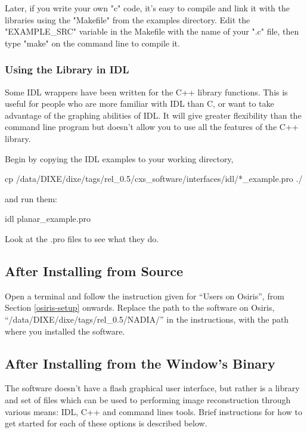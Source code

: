 \documentclass[]{nadia}
\begin{document}
Later, if you write your own "c" code, it's easy to compile and link
it with the libraries using the "Makefile" from the examples
directory. Edit the "EXAMPLE\_SRC" variable in the Makefile with the
name of your ".c" file, then type "make" on the command line to
compile it.

\subsubsection{Using the Library in IDL}

Some IDL wrappers have been written for the C++ library
functions. This is useful for people who are more familiar with IDL
than C, or want to take advantage of the graphing abilities of IDL.
It will give greater flexibility than the command line program but
doesn't allow you to use all the features of the C++ library.

Begin by copying the IDL examples to your working directory, 
\begin{myverbatim}
   cp /data/DIXE/dixe/tags/rel_0.5/cxs_software/interfaces/idl/*_example.pro ./ 
\end{myverbatim}
and run them: 
\begin{myverbatim}
   idl planar_example.pro
\end{myverbatim}

Look at the .pro files to see what they do. 


\subsection{After Installing from Source}

Open a terminal and follow the instruction given for ``Users on
Osiris'', from Section \ref{osiris-setup} onwards. Replace the path to
the software on Osiris,
``/data/DIXE/dixe/tags/rel\_0.5/NADIA/'' in the instructions,
with the path where you installed the software.

\subsection{After Installing from the Window's Binary}

The software doesn't have a flash graphical user interface, but rather
is a library and set of files which can be used to performing image
reconstruction through various means: IDL, C++ and command lines
tools. Brief instructions for how to get started for each of these
options is described below.
\end{document}
